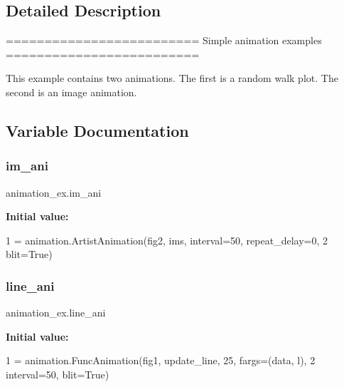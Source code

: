 \subsection{Detailed Description}
\begin{DoxyVerb}=========================
Simple animation examples
=========================

This example contains two animations. The first is a random walk plot. The
second is an image animation.
\end{DoxyVerb}
 

\subsection{Variable Documentation}
\mbox{\label{namespaceanimation__ex_ab0383e2a36c5426861a44c34ab3fcc59}} 
\subsubsection{\texorpdfstring{im\+\_\+ani}{im\_ani}}
{\footnotesize\ttfamily animation\+\_\+ex.\+im\+\_\+ani}

{\bfseries Initial value\+:}
\begin{DoxyCode}
1 =  animation.ArtistAnimation(fig2, ims, interval=50, repeat\_delay=0,
2                                    blit=\textcolor{keyword}{True})
\end{DoxyCode}
\mbox{\label{namespaceanimation__ex_a9106489832e7ffd8ba98df3ba6d206b4}} 
\subsubsection{\texorpdfstring{line\+\_\+ani}{line\_ani}}
{\footnotesize\ttfamily animation\+\_\+ex.\+line\+\_\+ani}

{\bfseries Initial value\+:}
\begin{DoxyCode}
1 =  animation.FuncAnimation(fig1, update\_line, 25, fargs=(data, l),
2                                    interval=50, blit=\textcolor{keyword}{True})
\end{DoxyCode}
